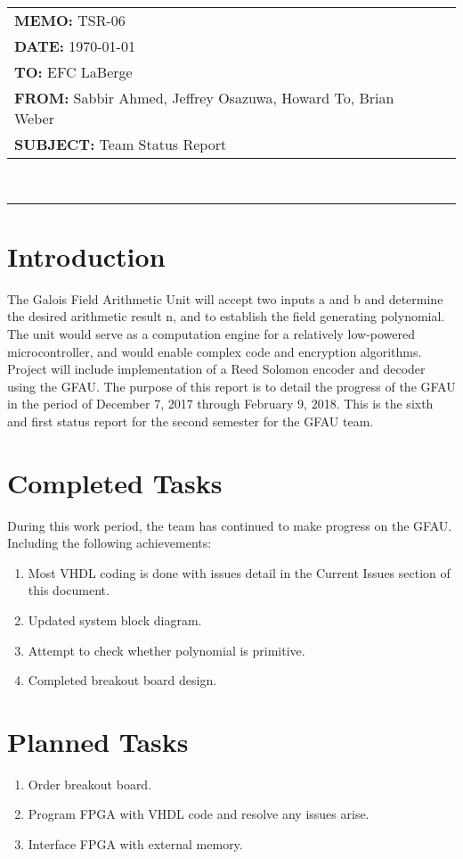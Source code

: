 \documentclass[paper=usletter, fontsize=12pt]{article}
\newcommand{\Sabbir}{Sabbir Ahmed}
\newcommand{\Jeffrey}{Jeffrey Osazuwa}
\newcommand{\Howard}{Howard To}
\newcommand{\Brian}{Brian Weber}
\newcommand{\documentinfo}[5]{
    \begin{centering}
        \parbox{6.8in}{
        \begin{spacing}{1}
            \begin{flushleft}
                \begin{tabular}{l l} #1 \\ #2 \\ #3 \\ #4 \\ #5 \\
                \end{tabular} \\
                \rule{\textwidth}{1pt}
            \end{flushleft}
        \end{spacing} }
    \end{centering} }
\begin{document}
    \documentinfo{\textbf{MEMO:} TSR-06}{\textbf{DATE: }{\today}}{\textbf{TO: }
    EFC LaBerge}{\textbf{FROM: }\Sabbir, \Jeffrey, \Howard,
    \Brian}{\textbf{SUBJECT: } Team Status Report}
    \vspace{-0.3in}

    \section{Introduction} The Galois Field Arithmetic Unit will accept two inputs
    a and b and determine the desired arithmetic result n, and to establish the field generating polynomial. The unit would serve as a computation engine for a relatively low-powered
    microcontroller, and would enable complex code and encryption algorithms.
    Project will include implementation of a Reed Solomon encoder and decoder
    using the GFAU. The purpose of this report is to detail the progress of the
    GFAU in the period of December 7, 2017 through February 9, 2018. This is
    the sixth and first status report for the second semester for the GFAU
    team.

    \section{Completed Tasks} During this work period, the team has continued
    to make progress on the GFAU. Including the following achievements:
    \begin{enumerate}[label=\alph*)]

        \item Most VHDL coding is done with issues detail in the Current Issues section of this document. 
        \item Updated system block diagram. 
        \item Attempt to check whether polynomial is primitive. 
        \item Completed breakout board design. 

        
    \end{enumerate}

    \section{Planned Tasks}
   
    \begin{enumerate}[label=\alph*)]

        \item Order breakout board.
        \item Program FPGA with VHDL code and resolve any issues arise. 
        \item Interface FPGA with external memory.

    \end{enumerate}
\end{document}
